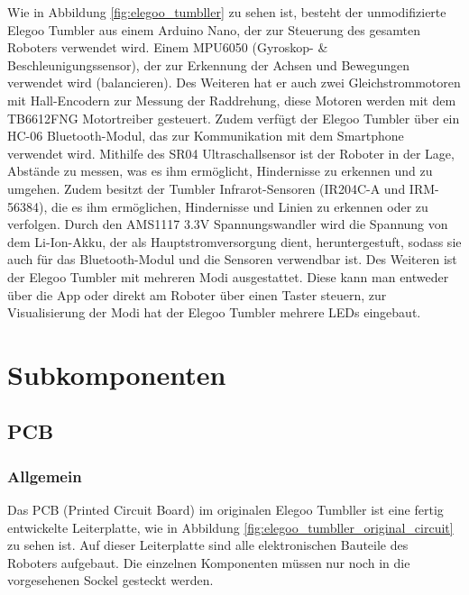 Wie in Abbildung \ref{fig:elegoo_tumbller} zu sehen ist,
besteht der unmodifizierte Elegoo Tumbler aus einem Arduino Nano,
der zur Steuerung des gesamten Roboters verwendet wird.
%
Einem MPU6050 (Gyroskop- \& Beschleunigungssensor),
der zur Erkennung der Achsen und Bewegungen verwendet wird (balancieren).
%
Des Weiteren hat er auch zwei Gleichstrommotoren mit Hall-Encodern zur Messung der Raddrehung,
diese Motoren werden mit dem TB6612FNG Motortreiber gesteuert.
%
Zudem verfügt der Elegoo Tumbler über ein HC-06 Bluetooth-Modul,
das zur Kommunikation mit dem Smartphone verwendet wird.
%
Mithilfe des SR04 Ultraschallsensor ist der Roboter in der Lage,
Abstände zu messen, was es ihm ermöglicht, Hindernisse zu erkennen und zu umgehen.
%
Zudem besitzt der Tumbler Infrarot-Sensoren (IR204C-A und IRM-56384), die es ihm ermöglichen,
Hindernisse und Linien zu erkennen oder zu verfolgen.
%
Durch den AMS1117 3.3V Spannungswandler wird die Spannung von dem Li-Ion-Akku,
der als Hauptstromversorgung dient, heruntergestuft,
sodass sie auch für das Bluetooth-Modul und die Sensoren verwendbar ist.
%
Des Weiteren ist der Elegoo Tumbler mit mehreren Modi ausgestattet.
%
Diese kann man entweder über die App oder direkt am Roboter über einen Taster steuern,
zur Visualisierung der Modi hat der Elegoo Tumbler mehrere LEDs eingebaut.
\section{Subkomponenten}
\label{subsec:subkomponenten}
%
\subsection{PCB}
%
\subsubsection{Allgemein}
Das PCB (Printed Circuit Board) im originalen Elegoo Tumbller ist eine fertig entwickelte Leiterplatte,
wie in Abbildung \ref{fig:elegoo_tumbller_original_circuit} zu sehen ist.
%
Auf dieser Leiterplatte sind alle elektronischen Bauteile des Roboters aufgebaut.
%
Die einzelnen Komponenten müssen nur noch in die vorgesehenen Sockel gesteckt werden.
%
